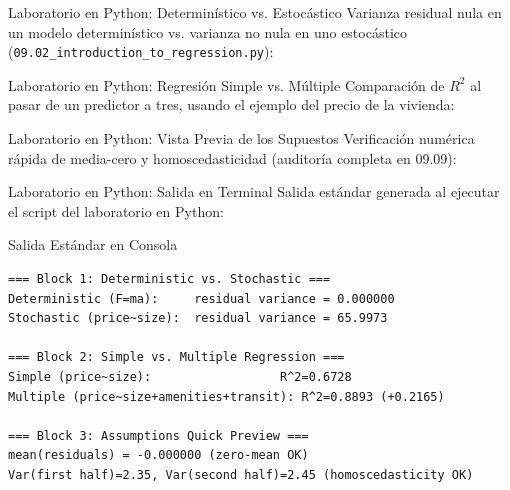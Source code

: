 \documentclass[10pt, aspectratio=169]{beamer}
\begin{document}
\begin{frame}[fragile]{Laboratorio en Python: Determinístico vs. Estocástico}
  \scriptsize
  Varianza residual nula en un modelo determinístico vs. varianza no nula en uno estocástico (\texttt{09.02\_introduction\_to\_regression.py}):
  {
  }
\end{frame}

\begin{frame}[fragile]{Laboratorio en Python: Regresión Simple vs. Múltiple}
  \scriptsize
  Comparación de $R^2$ al pasar de un predictor a tres, usando el ejemplo del precio de la vivienda:
  {
  }
\end{frame}

\begin{frame}[fragile]{Laboratorio en Python: Vista Previa de los Supuestos}
  \scriptsize
  Verificación numérica rápida de media-cero y homoscedasticidad (auditoría completa en 09.09):
  {
  }
\end{frame}

\begin{frame}[fragile]{Laboratorio en Python: Salida en Terminal}
  \scriptsize
  Salida estándar generada al ejecutar el script del laboratorio en Python:
  \vspace{0.02cm}
  \begin{block}{Salida Estándar en Consola}
    \fontsize{3.6pt}{4.3pt}\selectfont
    \begin{verbatim}
=== Block 1: Deterministic vs. Stochastic ===
Deterministic (F=ma):     residual variance = 0.000000
Stochastic (price~size):  residual variance = 65.9973

=== Block 2: Simple vs. Multiple Regression ===
Simple (price~size):                  R^2=0.6728
Multiple (price~size+amenities+transit): R^2=0.8893 (+0.2165)

=== Block 3: Assumptions Quick Preview ===
mean(residuals) = -0.000000 (zero-mean OK)
Var(first half)=2.35, Var(second half)=2.45 (homoscedasticity OK)
    \end{verbatim}
  \end{block}
\end{frame}
\end{document}
